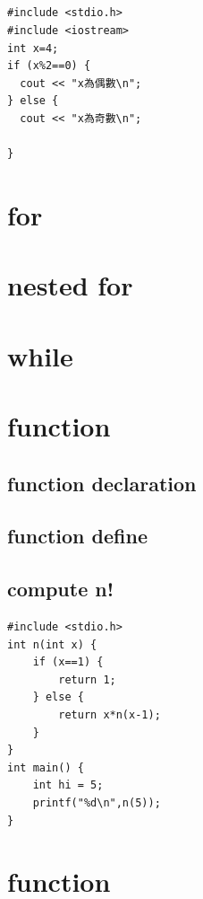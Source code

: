 \documentclass[12pt,a4paper]{article}
\begin{document}
\subsection*{}
\label{sec:org2dee127}
\begin{verbatim}
#include <stdio.h>
#include <iostream>
int x=4;
if (x%2==0) {
  cout << "x為偶數\n";
} else {
  cout << "x為奇數\n";

}
\end{verbatim}

\section*{for}
\label{sec:org7782de6}

\section*{nested for}
\label{sec:org5bd5b06}

\section*{while}
\label{sec:orgc5e5187}

\section*{function}
\label{sec:org55b6415}

\subsection*{function declaration}
\label{sec:org70714dd}

\subsection*{function define}
\label{sec:org7a69313}

\subsection*{compute n!}
\label{sec:orgf109dd5}
\begin{verbatim}
#include <stdio.h>
int n(int x) {
    if (x==1) {
        return 1;
    } else {
        return x*n(x-1);
    }
}
int main() {
    int hi = 5;
    printf("%d\n",n(5));
}

\end{verbatim}

\section*{function}
\label{sec:orgfa849f2}
\end{document}
